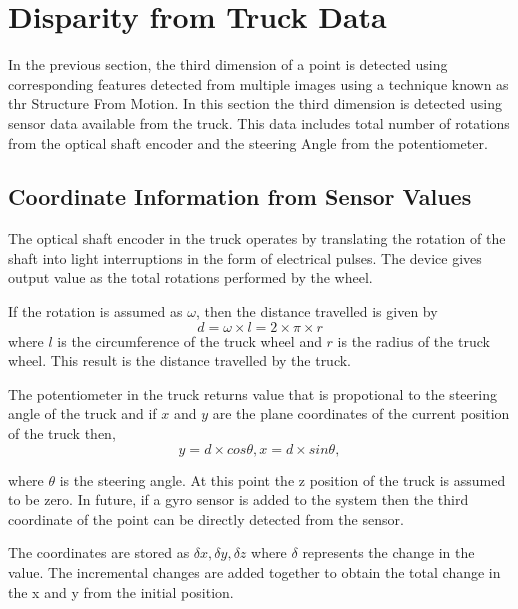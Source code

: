 
\chapter{Disparity from Truck Data}
\label{chap:Res}
In the previous section, the third dimension of a point is detected using corresponding features detected from multiple images using a technique known as thr Structure From Motion. In this section the third dimension is detected using sensor data available from the truck. This data includes total number of rotations from the optical shaft encoder and the steering Angle from the potentiometer. 

\section{Coordinate Information from Sensor Values}

The optical shaft encoder in the truck operates by translating the rotation of the shaft into light interruptions in the form of electrical pulses. The device gives output value as the total rotations performed by the wheel.

If the rotation is assumed as \(\omega\), then the distance travelled is given by \[ d = \omega \times l = 2\times \pi \times r \] where $l$ is the circumference of the truck wheel and $r$ is the radius of the truck wheel. This result is the distance travelled by the truck.

The potentiometer in the truck returns value that is propotional to the steering angle of the truck and if $x$ and $y$ are the plane coordinates of the current position of the truck then, \[ y=d \times cos\theta, x=d \times sin\theta, \] 

where $\theta$ is the steering angle. At this point the z position of the truck is assumed to be zero. In future, if a gyro sensor is added to the system then the third coordinate of the point can be directly detected from the sensor.

The coordinates are stored as \( \delta x , \delta y , \delta z \) where $\delta$ represents the change in the value. The incremental changes are added together to obtain the total change in the x and y from the initial position.

